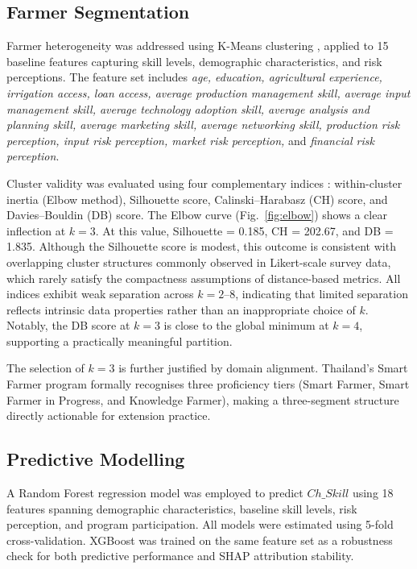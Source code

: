 \documentclass[3p,twocolumn,authoryear]{elsarticle}
\begin{document}
\subsection{Farmer Segmentation}

Farmer heterogeneity was addressed using K-Means clustering
\citep{macqueen1967}, applied to 15 baseline features capturing skill
levels, demographic characteristics, and risk perceptions.
The feature set includes \textit{age, education, agricultural experience,
irrigation access, loan access, average production management skill,
average input management skill, average technology adoption skill,
average analysis and planning skill, average marketing skill, average
networking skill, production risk perception, input risk perception,
market risk perception,} and \textit{financial risk perception}.

Cluster validity was evaluated using four complementary indices
\citep{rouseeuw1987}: within-cluster inertia (Elbow method), Silhouette
score, Calinski--Harabasz (CH) score, and Davies--Bouldin (DB) score.
The Elbow curve (Fig.~\ref{fig:elbow}) shows a clear inflection at $k = 3$.
At this value, Silhouette = 0.185, CH = 202.67, and DB = 1.835.
Although the Silhouette score is modest, this outcome is consistent with
overlapping cluster structures commonly observed in Likert-scale survey
data, which rarely satisfy the compactness assumptions of
distance-based metrics.
All indices exhibit weak separation across $k = 2$–$8$, indicating that
limited separation reflects intrinsic data properties rather than an
inappropriate choice of $k$.
Notably, the DB score at $k = 3$ is close to the global minimum at $k = 4$,
supporting a practically meaningful partition.

The selection of $k = 3$ is further justified by domain alignment.
Thailand’s Smart Farmer program formally recognises three proficiency
tiers (Smart Farmer, Smart Farmer in Progress, and Knowledge Farmer),
making a three-segment structure directly actionable for extension
practice.

\subsection{Predictive Modelling}

A Random Forest regression model \citep{breiman2001} was employed to
predict $Ch\_Skill$ using 18 features spanning demographic
characteristics, baseline skill levels, risk perception, and program
participation.
All models were estimated using 5-fold cross-validation.
XGBoost \citep{chen2016} was trained on the same feature set as a
robustness check for both predictive performance and SHAP attribution
stability.
\end{document}

